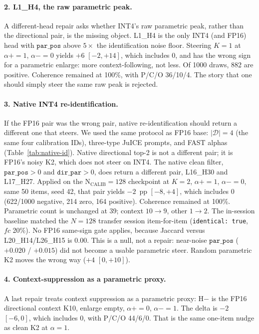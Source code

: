 \documentclass{article} %
\begin{document}
\paragraph{2. L1\_H4, the raw parametric peak.}
A different-head repair asks whether INT4's raw parametric peak, rather than the directional pair, is the missing object. L1\_H4 is the only INT4 (and FP16) head with $\texttt{par\_pos}$ above $5\times$ the identification noise floor. Steering $K{=}1$ at $\alpha{+}{=}1$, $\alpha{-}{=}0$ yields $+6$ $[-2, +14]$, which includes 0, and has the wrong sign for a parametric enlarge: more context-following, not less. Of 1000 draws, 882 are positive. Coherence remained at 100\%, with P/C/O 36/10/4. The story that one should simply steer the same raw peak is rejected.

\paragraph{3. Native INT4 re-identification.}
If the FP16 pair was the wrong pair, native re-identification should return a different one that steers. We used the same protocol as FP16 base: $|\mathcal{D}|{=}4$ (the same four calibration IDs), three-type JuICE prompts, and FAST alphas (Table~\ref{tab:native-id}). Native directional top-2 is not a different pair; it is FP16's noisy K2, which does not steer on INT4. The native clean filter, $\texttt{par\_pos}{>}0$ and $\texttt{dir\_par}{>}0$, does return a different pair, L16\_H30 and L17\_H27. Applied on the $\mathrm{N_{CALIB}{=}128}$ checkpoint at $K{=}2$, $\alpha{+}{=}1$, $\alpha{-}{=}0$, same 50 items, seed 42, that pair yields $-2$~pp $[-8, +4]$, which includes 0 (622/1000 negative, 214 zero, 164 positive). Coherence remained at 100\%. Parametric count is unchanged at 39; context $10{\to}9$, other $1{\to}2$. The in-session baseline matched the $N{=}128$ transfer session item-for-item (\texttt{identical: true}, $fc$ 20\%). No FP16 same-sign gate applies, because Jaccard versus L20\_H14/L26\_H15 is $0.00$. This is a null, not a repair: near-noise $\texttt{par\_pos}$ ($+0.020$ / $+0.015$) did not become a usable parametric steer. Random parametric K2 moves the wrong way ($+4$ $[0, +10]$).

\paragraph{4. Context-suppression as a parametric proxy.}
A last repair treats context suppression as a parametric proxy: H$-$ is the FP16 directional context K10, enlarge empty, $\alpha{+}{=}0$, $\alpha{-}{=}1$. The delta is $-2$ $[-6, 0]$, which includes 0, with P/C/O 44/6/0. That is the same one-item nudge as clean K2 at $\alpha{=}1$.
\end{document}
